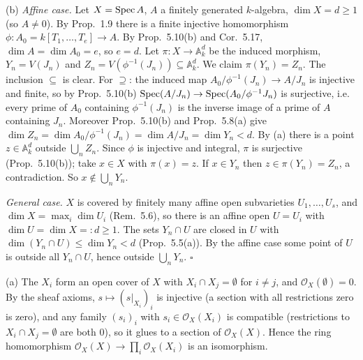 \documentclass[11pt]{article}
\begin{document}
(b) \emph{Affine case.} Let $X=\operatorname{Spec} A$, $A$ a finitely generated $k$-algebra, $\dim X=d\ge1$ (so $A\ne0$). By Prop.~1.9 there is a finite injective homomorphism $\phi:A_0=k[T_1,\dots,T_e]\to A$. By Prop.~5.10(b) and Cor.~5.17, $\dim A=\dim A_0=e$, so $e=d$. Let $\pi:X\to\mathbb A^d_k$ be the induced morphism, $Y_n=V(J_n)$ and $Z_n=V(\phi^{-1}(J_n))\subseteq\mathbb A^d_k$. We claim $\pi(Y_n)=Z_n$. The inclusion $\subseteq$ is clear. For $\supseteq$: the induced map $A_0/\phi^{-1}(J_n)\to A/J_n$ is injective and finite, so by Prop.~5.10(b) $\operatorname{Spec}(A/J_n)\to\operatorname{Spec}(A_0/\phi^{-1}J_n)$ is surjective, i.e. every prime of $A_0$ containing $\phi^{-1}(J_n)$ is the inverse image of a prime of $A$ containing $J_n$. Moreover Prop.~5.10(b) and Prop.~5.8(a) give $\dim Z_n=\dim A_0/\phi^{-1}(J_n)=\dim A/J_n=\dim Y_n<d$. By (a) there is a point $z\in\mathbb A^d_k$ outside $\bigcup_nZ_n$. Since $\phi$ is injective and integral, $\pi$ is surjective (Prop.~5.10(b)); take $x\in X$ with $\pi(x)=z$. If $x\in Y_n$ then $z\in\pi(Y_n)=Z_n$, a contradiction. So $x\notin\bigcup_nY_n$.

\emph{General case.} $X$ is covered by finitely many affine open subvarieties $U_1,\dots,U_s$, and $\dim X=\max_i\dim U_i$ (Rem.~5.6), so there is an affine open $U=U_i$ with $\dim U=\dim X=:d\ge1$. The sets $Y_n\cap U$ are closed in $U$ with $\dim(Y_n\cap U)\le\dim Y_n<d$ (Prop.~5.5(a)). By the affine case some point of $U$ is outside all $Y_n\cap U$, hence outside $\bigcup_nY_n$. \hfill$\square$

\pf
(a) The $X_i$ form an open cover of $X$ with $X_i\cap X_j=\emptyset$ for $i\ne j$, and $\mathcal O_X(\emptyset)=0$. By the sheaf axioms, $s\mapsto(s|_{X_i})_i$ is injective (a section with all restrictions zero is zero), and any family $(s_i)_i$ with $s_i\in\mathcal O_X(X_i)$ is compatible (restrictions to $X_i\cap X_j=\emptyset$ are both $0$), so it glues to a section of $\mathcal O_X(X)$. Hence the ring homomorphism $\mathcal O_X(X)\to\prod_i\mathcal O_X(X_i)$ is an isomorphism.
\end{document}
